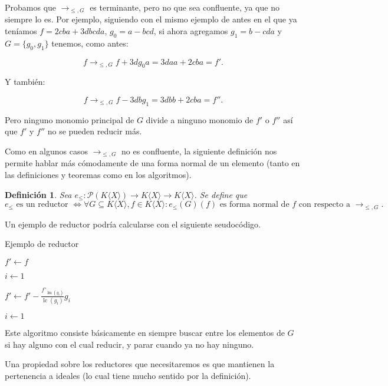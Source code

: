 \documentclass[12pt]{report}
\theoremstyle{customstyle}
\newtheorem{definition}[theorem]{Definición}
\theoremstyle{factstyle}
\DeclareMathOperator{\sop}{sop}
\DeclareMathOperator{\lm}{lm}
\DeclareMathOperator{\lc}{lc}
\begin{document}
Probamos que $→_{≤, G}$ es terminante, pero no que sea confluente, ya que no siempre lo es. Por ejemplo, siguiendo con el mismo ejemplo de antes en el que ya teníamos $f = 2 cba + 3 dbcda$, $g_0 = a - bcd$, si ahora agregamos $g_1 = b - cda$ y $G = \{g_0, g_1\}$ tenemos, como antes:

\[f →_{≤, G} f + 3d g_0 a = 3 daa + 2 cba = f' \text{.}\]

\noindent Y también:

\[f →_{≤, G} f - 3db g_1 = 3 dbb + 2 cba = f'' \text{.}\]

\noindent Pero ninguno monomio principal de $G$ divide a ninguno monomio de $f'$ o $f''$ así que $f'$ y $f''$ no se pueden reducir más.

Como en algunos casos $→_{≤, G}$ no es confluente, la siguiente definición nos permite hablar más cómodamente de una forma normal de un elemento (tanto en las definiciones y teoremas como en los algoritmos).

\begin{definition}\label{def:reductor}
  Sea $e_≤ : 𝒫(K⟨X⟩) → K⟨X⟩ → K⟨X⟩$. Se define que
  \[ e_≤\text{ es un reductor }⇔ ∀G ⊆ K⟨X⟩, f ∈ K⟨X⟩ : e_≤(G)(f)\text{ es forma normal de }f\text{ con respecto a }→_{≤, G} \text{.} \]
\end{definition}

Un ejemplo de reductor podría calcularse con el siguiente seudocódigo.

\begin{algorithm}[H] %
  \caption{Ejemplo de reductor}\label{alg:reductor}
  $f' ← f$

  $i ← 1$

   {
     {
      \If{$g_i ∈ \sop(f')$} {
        $f' ← f' - \frac{f'_{\lm(g_i)}}{\lc(g_i)}g_i$

        $i ← 1$

        \Break
      }
    }
  }
\end{algorithm}

Este algoritmo consiste básicamente en siempre buscar entre los elementos de $G$ si hay alguno con el cual reducir, y parar cuando ya no hay ninguno.

Una propiedad sobre los reductores que necesitaremos es que mantienen la pertenencia a ideales (lo cual tiene mucho sentido por la definición).
\end{document}
